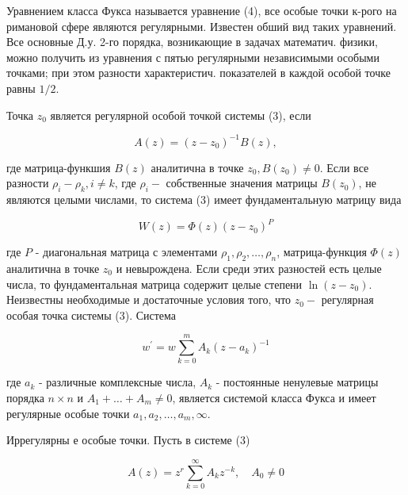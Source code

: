 \documentclass[10pt]{article}
\begin{document}
Уравнением класса Фукса называется уравнение (4), все особые точки к-рого на римановой сфере являются регулярными. Известен обший вид таких уравнений. Все основные Д.у. 2-го порядка, возникающие в задачах математич. физики, можно получить из уравнения с пятью регулярными независимыми особыми точками; при этом разности характеристич. показателей в каждой особой точке равны $1 / 2$.



Точка $z_{0}$ является регулярной особой точкой системы (3), если



\[

A(z)=\left(z-z_{0}\right)^{-1} B(z),

\]



где матрица-функшия $B(z)$ аналитична в точке $z_{0}, B\left(z_{0}\right) \neq 0$. Если все разности $\rho_{i}-\rho_{k}, i \neq k$, где $\rho_{i}-$ собственные значения матрицы $B\left(z_{0}\right)$, не являются целыми числами, то система (3) имеет фундаментальную матрицу вида



\[

W(z)=\Phi(z)\left(z-z_{0}\right)^{P}

\]



где $P$ - диагональная матрица с элементами $\rho_{1}, \rho_{2}, \ldots, \rho_{n}$, матрица-функция $\Phi(z)$ аналитична в точке $z_{0}$ и невырождена. Если среди этих разностей есть целые числа, то фундаментальная матрица содержит целые степени $\ln \left(z-z_{0}\right)$. Неизвестны необходимые и достаточные условия того, что $z_{0}-$ регулярная особая точка системы (3). Система



\[

w^{\prime}=w \sum_{k=0}^{m} A_{k}\left(z-a_{k}\right)^{-1}

\]



где $a_{k}$ - различные комплексные числа, $A_{k}$ - постоянные ненулевые матрицы порядка $n \times n$ и $A_{1}+\ldots+A_{m} \neq 0$, является системой класса Фукса и имеет регулярные особые точки $a_{1}, a_{2}, \ldots, a_{m}, \infty$.



Иррегулярны е особые точки. Пусть в системе (3)



\[

A(z)=z^{r} \sum_{k=0}^{\infty} A_{k} z^{-k}, \quad A_{0} \neq 0

\]
\end{document}
